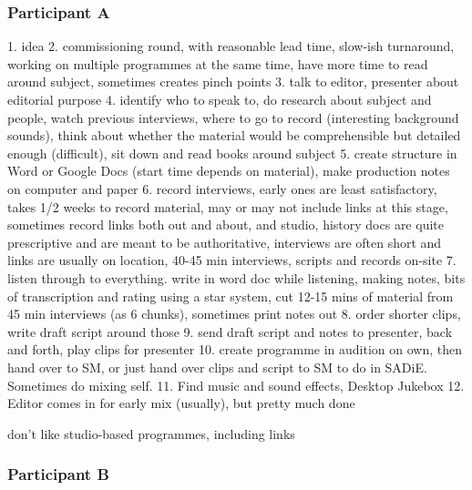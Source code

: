 \subsubsection{Participant A}
1. idea
2. commissioning round, with reasonable lead time, slow-ish turnaround, working
on multiple programmes at the same time, have more time to read around subject,
sometimes creates pinch points
3. talk to editor, presenter about editorial purpose
4. identify who to speak to, do research about subject and people, watch
previous interviews, where to go to record (interesting background sounds),
think about whether the material would be comprehensible but detailed enough
(difficult), sit down and read books around subject
5. create structure in Word or Google Docs (start time depends on material),
make production notes on computer and paper
6. record interviews, early ones are least satisfactory, takes 1/2 weeks to
record material, may or may not include links at this stage, sometimes record
links both out and about, and studio, history docs are quite prescriptive and
are meant to be authoritative, interviews are often short and links are usually
on location, 40-45 min interviews, scripts and records on-site
7. listen through to everything. write in word doc while listening, making
notes, bits of transcription and rating using a star system, cut 12-15 mins of
material from 45 min interviews (as 6 chunks), sometimes print notes out
8. order shorter clips, write draft script around those
9. send draft script and notes to presenter, back and forth, play clips for
presenter
10. create programme in audition on own, then hand over to SM, or just hand
over clips and script to SM to do in SADiE. Sometimes do mixing self.
11. Find music and sound effects, Desktop Jukebox
12. Editor comes in for early mix (usually), but pretty much done

don't like studio-based programmes, including links

\subsubsection{Participant B}

